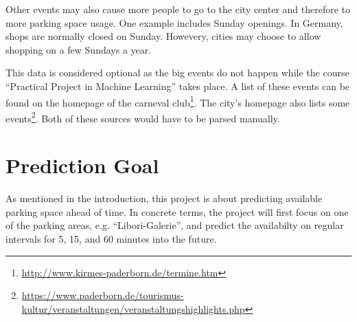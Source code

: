 \documentclass[journal,10pt]{IEEEtran}
\begin{document}
Other events may also cause more people to go to the city center and therefore to more parking space usage. One example includes Sunday openings. In Germany, shops are normally closed on Sunday. Howevery, cities may choose to allow shopping on a few Sundays a year. 

This data is considered optional as the big events do not happen while the course ``Practical Project in Machine Learning'' takes place. A list of these events can be found on the homepage of the carneval club\footnote{\url{http://www.kirmes-paderborn.de/termine.htm}}. The city's homepage also lists some events\footnote{\url{https://www.paderborn.de/tourismus-kultur/veranstaltungen/veranstaltungshighlights.php}}. Both of these sources would have to be parsed manually.


\section{Prediction Goal}
As mentioned in the introduction, this project is about predicting available parking space ahead of time. In concrete terms, the project will first focus on one of the parking areas, e.g. ``Libori-Galerie'', and predict the availabilty on regular intervals for 5, 15, and 60 minutes into the future.




\end{document}
